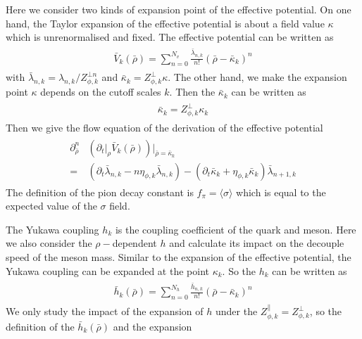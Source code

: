 \documentclass[%
reprint,
superscriptaddress,
showpacs,preprintnumbers,
 amsmath,amssymb,
 aps,
prd,
]{revtex4-1}
\begin{document}
Here we consider two kinds of expansion point of the effective potential. On one hand, the Taylor expansion of the effective 
potential is about a field value $\kappa$ which is unrenormalised and fixed. The effective potential can be written as
\begin{align}\label{}
\begin{split}
\bar{V}_k(\bar{\rho})=\sum^{N_v}_{n=0}\frac{\bar{\lambda}_{n,k}}{n!}(\bar{\rho}-\bar{\kappa}_k)^n
\end{split}
\end{align}
with $\bar{\lambda}_{n,k}=\lambda_{n,k}/Z^{\bot n}_{\phi,k}$ and $\bar{\kappa}_k=Z^{\bot}_{\phi,k}\kappa$.
The other hand, we make the expansion point $\kappa$ depends on the cutoff scales $k$. Then the $\bar{\kappa}_k$ 
can be written as
\begin{align}\label{}
\begin{split}
\bar{\kappa}_k=Z^{\bot}_{\phi,k}\kappa_k
\end{split}
\end{align} 
Then we give the flow equation of the derivation of the effective potential
\begin{align}\label{}
\begin{split}
\partial^{n}_{\bar{\rho}}&(\partial_t\big|_{\rho}\bar{V}_k(\bar{\rho}))\bigg|_{\bar{\rho}=\bar{\kappa}_k}\\
=&(\partial_t\bar{\lambda}_{n,k}-n\eta_{\phi,k}\bar{\lambda}_{n,k})-(\partial_t\bar{\kappa}_k+\eta_{\phi,k}\bar{\kappa}_k)\bar{\lambda}_{n+1,k}
\end{split}
\end{align} 
The definition of the pion decay constant is $f_\pi=\langle\sigma\rangle$
which is equal to the expected value of the $\sigma$ field.\par
The Yukawa coupling $h_k$ is the coupling coefficient of the quark and meson. Here we also consider the $\rho-$dependent $h$ and calculate its
impact on the decouple speed of the meson mass. Similar to the expansion of the effective potential, the Yukawa coupling can be expanded at the point
$\kappa_k$. So the $h_k$ can be written as
\begin{align}\label{}
\begin{split}
\bar{h}_k(\bar{\rho})=\sum^{N_h}_{n=0}\frac{\bar{h}_{n,k}}{n!}(\bar{\rho}-\bar{\kappa}_k)^n
\end{split}
\end{align}
We only study the impact of the expansion of $h$ under the $Z^{\|}_{\phi,k}=Z^{\bot}_{\phi,k}$, so the definition of the $\bar{h}_k(\bar{\rho})$ and the expansion
\end{document}
